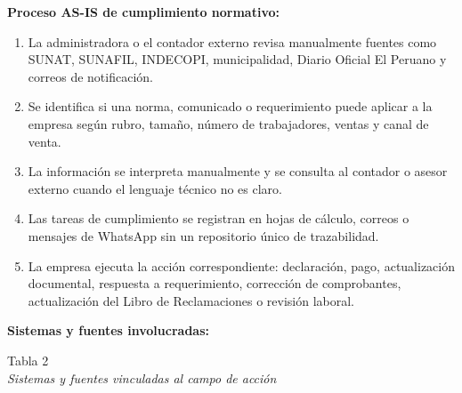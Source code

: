 \documentclass[12pt,a4paper,oneside]{report}
\begin{document}
\textbf{Proceso AS-IS de cumplimiento normativo:}

\begin{enumerate}
\def\labelenumi{\arabic{enumi}.}
\item
  La administradora o el contador externo revisa manualmente fuentes
  como SUNAT, SUNAFIL, INDECOPI, municipalidad, Diario Oficial El
  Peruano y correos de notificación.
\item
  Se identifica si una norma, comunicado o requerimiento puede aplicar a
  la empresa según rubro, tamaño, número de trabajadores, ventas y canal
  de venta.
\item
  La información se interpreta manualmente y se consulta al contador o
  asesor externo cuando el lenguaje técnico no es claro.
\item
  Las tareas de cumplimiento se registran en hojas de cálculo, correos o
  mensajes de WhatsApp sin un repositorio único de trazabilidad.
\item
  La empresa ejecuta la acción correspondiente: declaración, pago,
  actualización documental, respuesta a requerimiento, corrección de
  comprobantes, actualización del Libro de Reclamaciones o revisión
  laboral.
\end{enumerate}

\textbf{Sistemas y fuentes involucradas:}

\label{_Toc231672257}{}Tabla 2\\
\emph{Sistemas y fuentes vinculadas al campo de acción}
\end{document}
